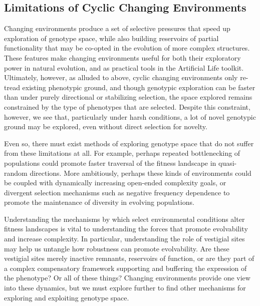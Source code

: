 \documentclass[10pt,letterpaper,final]{article}
\begin{document}
\subsection*{Limitations of Cyclic Changing Environments}
Changing environments produce a set of selective pressures that speed up exploration of genotype space, while also building reservoirs of partial functionality that may be co-opted in the evolution of more complex structures. These features make changing environments useful for both their exploratory power in natural evolution, and as practical tools in the Artificial Life toolkit.
Ultimately, however, as alluded to above, cyclic changing environments only re-tread existing phenotypic ground, and though genotypic exploration can be faster than under purely directional or stabilizing selection, the space explored remains constrained by the type of phenotypes that are selected. Despite this constraint, however, we see that, particularly under harsh conditions, a lot of novel genotypic ground may be explored, even without direct selection for novelty. 

Even so, there must exist methods of exploring genotype space that do not suffer from these limitations at all.
For example, perhaps repeated bottlenecking of populations could promote faster traversal of the fitness landscape in quasi-random directions. More ambitiously, perhaps these kinds of environments could be coupled with dynamically increasing open-ended complexity goals, or divergent selection mechanisms such as negative frequency dependence to promote the maintenance of diversity in evolving populations.

Understanding the mechanisms by which select environmental conditions alter fitness landscapes is vital to understanding the forces that promote evolvability and increase complexity. In particular, understanding the role of vestigial sites may help us untangle how robustness can promote evolvability. Are these vestigial sites merely inactive remnants, reservoirs of function, or are they part of a complex compensatory framework supporting and buffering the expression of the phenotype? Or all of these things? Changing environments provide one view into these dynamics, but we must explore further to find other mechanisms for exploring and exploiting genotype space.
\end{document}
